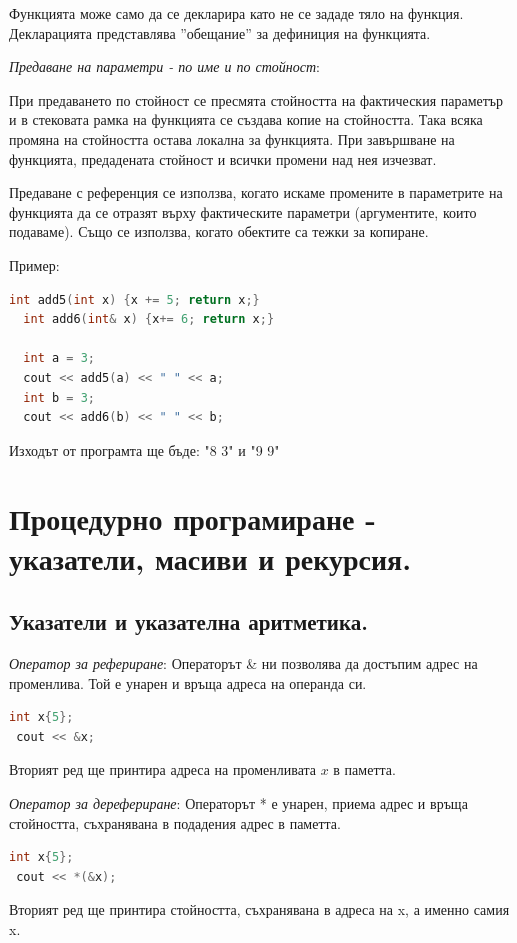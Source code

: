 \documentclass{article}
\renewcommand{\\}{\newline}
\begin{document}
Функцията може само да се декларира като не се зададе тяло на функция. Декларацията представлява ''обещание'' за дефиниция на функцията. 

\textit{Предаване на параметри - по име и по стойност}: 

При предаването по стойност се пресмята стойността на фактическия параметър и в стековата рамка на функцията се създава копие на стойността. Така всяка промяна на стойността остава локална за функцията. При завършване на функцията, предадената стойност и всички промени над нея изчезват.

Предаване с референция се използва, когато искаме промените в параметрите на функцията да се отразят върху фактическите параметри (аргументите, които подаваме). Също се използва, когато обектите са тежки за копиране.

Пример:
\begin{lstlisting}[language=C++]
  int add5(int x) {x += 5; return x;}
  int add6(int& x) {x+= 6; return x;}

  int a = 3; 
  cout << add5(a) << " " << a;
  int b = 3;
  cout << add6(b) << " " << b;
\end{lstlisting}

Изходът от програмта ще бъде: "8 3" и "9 9"


\newpage
\section{Процедурно програмиране - указатели, масиви и рекурсия.}
\subsection{Указатели и указателна аритметика.}
\textit{Оператор за рефериране}: Операторът \& ни позволява да достъпим адрес на променлива. Той е унарен и връща адреса на операнда си.
\begin{lstlisting}[language=C++]
 int x{5};
 cout << &x;
\end{lstlisting}

Вторият ред ще принтира адреса на променливата \(x\) в паметта. 

\textit{Оператор за дерефериране}: Операторът * е унарен, приема адрес и връща стойността, съхранявана в подадения адрес в паметта.
\begin{lstlisting}[language=C++]
 int x{5};
 cout << *(&x);
\end{lstlisting}

Вторият ред ще принтира стойността, съхранявана в адреса на x, а именно самия x.
\end{document}
